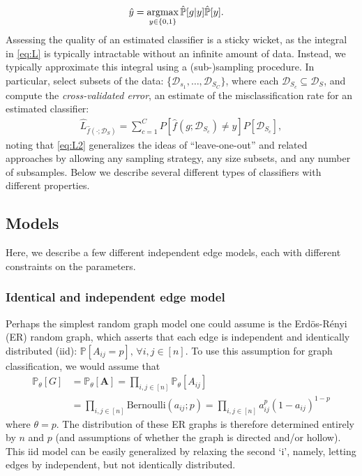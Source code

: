 \documentclass[10pt,journal,cspaper,compsoc]{IEEEtran}
\providecommand{\mc}[1]{\mathcal{#1}}
\providecommand{\mh}[1]{\hat{#1}}
\providecommand{\mvb}[1]{\mathbf{#1}}
\newcommand{\PP}{\mathbb{P}}
\newcommand{\argmax}{\operatornamewithlimits{argmax}}
\newcommand{\thet}{\theta}
\begin{document}
\begin{align} \label{eq:plugin}
	\mh{y} &= \argmax_{y \in \{0,1\}} \mh{\PP}[g | y] \mh{\PP}[y].  
\end{align}
Assessing the quality of an estimated classifier is a sticky wicket, as the integral in \eqref{eq:L} is typically intractable without an infinite amount of data.  Instead, we typically approximate this integral using a (sub-)sampling procedure.  In particular, select subsets of the data: \{$\mc{D}_{s_1},\ldots, \mc{D}_{S_C}\}$, where each $\mc{D}_{S_c} \subseteq \mc{D}_S$, and compute the \emph{cross-validated error}, an estimate of the misclassification rate for an estimated classifier:
\begin{align} \label{eq:L2}
	\mh{L}_{\mh{f}(\cdot; \mc{D}_S)} = \sum_{c=1}^C P[\mh{f}(g; \mc{D}_{S_c}) \neq y]  P[\mc{D}_{S_c}],
\end{align}
noting that \eqref{eq:L2} generalizes the ideas of ``leave-one-out'' and related approaches by allowing any sampling strategy, any size subsets, and any number of subsamples.  Below we describe several different types of classifiers with different properties.


\subsection{Models} %
\label{sub:models}

Here, we describe a few different independent edge models, each with different constraints on the parameters.


\subsubsection{Identical and independent edge model} %
\label{sub:ER}


Perhaps the simplest random graph model one could assume is the Erd\"os-R\'enyi (ER) random graph, which asserts that each edge is independent and identically distributed (iid): $\PP[A_{ij}=p], \, \forall i,j \in [n]$.  To use this assumption for graph classification, we would assume that 
\begin{align}
	\PP_{\thet}[G]&=\PP_{\thet}[\mvb{A}]=\prod_{i,j \in [n]} \PP_{\thet}[A_{ij}] %
	\nonumber \\&= \prod_{i,j \in [n]} \text{Bernoulli}(a_{ij}; p) = \prod_{i,j \in [n]} a_{ij}^{p}(1-a_{ij})^{1-p}
\end{align}
where $\thet=p$.  The distribution of these ER graphs is therefore determined entirely by $n$ and $p$ (and assumptions of whether the graph is directed and/or hollow).  This iid model can be easily generalized by relaxing the second `i', namely, letting edges by independent, but not identically distributed.  
\end{document}
